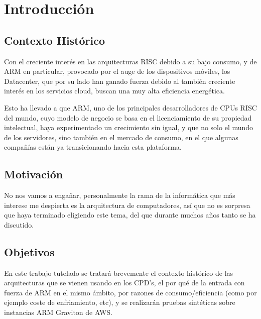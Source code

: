 \documentclass[a4paper,openright,12pt]{article}
\begin{document}
\newpage
\justifying{}

\section{Introducción}\label{section:introduccion}
\subsection{Contexto Histórico}
Con el creciente interés en las arquitecturas \gls{RISC} debido a su bajo consumo, y de \gls{ARM} en particular, provocado por el auge de los dispositivos móviles,
los Datacenter, que por su lado han ganado fuerza debido al también creciente interés en los servicios cloud, buscan una muy alta eficiencia
energética.

Esto ha llevado a que ARM, uno de los principales desarrolladores de CPUs RISC del mundo, cuyo modelo de negocio se basa en el licenciamiento de su propiedad intelectual,
haya experimentado un crecimiento sin igual, y que no solo el mundo de los servidores, sino también en el mercado de consumo, en el que algunas compañías están ya transicionando
hacia esta plataforma. \parencite{apple_m1_overview}

\subsection{Motivación}\label{subsection:motivacion}
No nos vamos a engañar, personalmente la rama de la informática que más interese me despierta es la arquitectura de computadores, así que no es sorpresa que haya terminado eligiendo
este tema, del que durante muchos años tanto se ha discutido. \parencite{risc_vs_cisc_6522302}

\subsection{Objetivos}\label{subsection:objetivos}
En este trabajo tutelado se tratará brevemente el contexto histórico de las arquitecturas que se vienen usando en los CPD's, el por qué de la entrada con fuerza de ARM en el
mismo ámbito, por razones de consumo/eficiencia (como por ejemplo coste de enfriamiento, etc), y se realizarán pruebas sintéticas sobre instancias ARM Graviton de \gls{AWS}. \parencite{arm_aws_graviton_overview}
\end{document}
